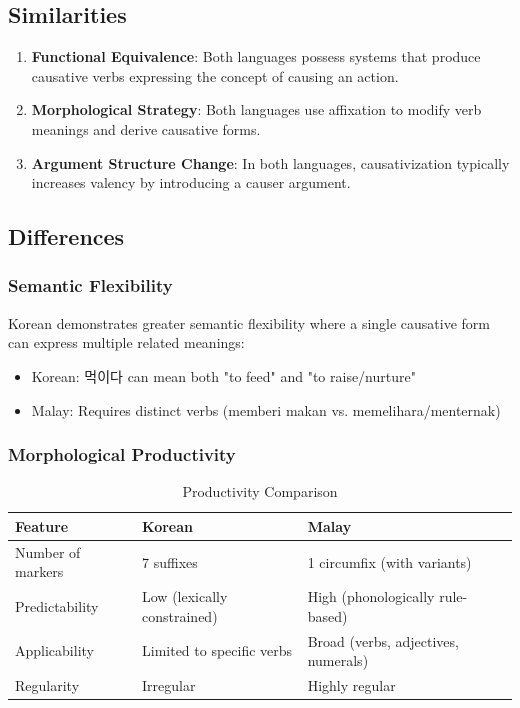 \documentclass[12pt,a4paper]{article}
\begin{document}
\subsection{Similarities}

\begin{enumerate}
\item \textbf{Functional Equivalence}: Both languages possess systems that produce causative verbs expressing the concept of causing an action.

\item \textbf{Morphological Strategy}: Both languages use affixation to modify verb meanings and derive causative forms.

\item \textbf{Argument Structure Change}: In both languages, causativization typically increases valency by introducing a causer argument.
\end{enumerate}

\subsection{Differences}

\subsubsection{Semantic Flexibility}
Korean demonstrates greater semantic flexibility where a single causative form can express multiple related meanings:
\begin{itemize}
\item Korean: 먹이다 can mean both "to feed" and "to raise/nurture"
\item Malay: Requires distinct verbs (memberi makan vs. memelihara/menternak)
\end{itemize}

\subsubsection{Morphological Productivity}
\begin{table}[h]
\centering
\caption{Productivity Comparison}
\begin{tabular}{|l|l|l|}
\hline
\textbf{Feature} & \textbf{Korean} & \textbf{Malay} \\
\hline
Number of markers & 7 suffixes & 1 circumfix (with variants) \\
Predictability & Low (lexically constrained) & High (phonologically rule-based) \\
Applicability & Limited to specific verbs & Broad (verbs, adjectives, numerals) \\
Regularity & Irregular & Highly regular \\
\hline
\end{tabular}
\end{table}
\end{document}
